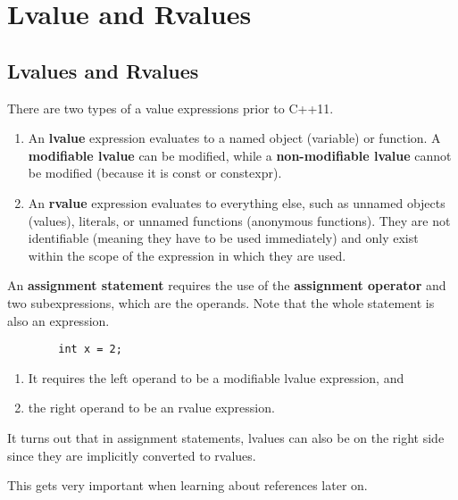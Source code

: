 \documentclass{article}
\begin{document}
\section{Lvalue and Rvalues} 

  \subsection{Lvalues and Rvalues}
  
    There are two types of a value expressions prior to C++11. 
    \begin{enumerate}
      \item An \textbf{lvalue} expression evaluates to a named object (variable) or function. A \textbf{modifiable lvalue} can be modified, while a \textbf{non-modifiable lvalue} cannot be modified (because it is const or constexpr). 
      \item An \textbf{rvalue} expression evaluates to everything else, such as unnamed objects (values), literals, or unnamed functions (anonymous functions). They are not identifiable (meaning they have to be used immediately) and only exist within the scope of the expression in which they are used. 
    \end{enumerate}

    \begin{example}
      An \textbf{assignment statement} requires the use of the \textbf{assignment operator} and two subexpressions, which are the operands. Note that the whole statement is also an expression. 
      \begin{lstlisting}
        int x = 2; 
      \end{lstlisting}
      \begin{enumerate}
        \item It requires the left operand to be a modifiable lvalue expression, and
        \item the right operand to be an rvalue expression. 
      \end{enumerate}
    \end{example} 

    \begin{lemma}
      It turns out that in assignment statements, lvalues can also be on the right side since they are implicitly converted to rvalues. 
    \end{lemma}

    This gets very important when learning about references later on.
\end{document}
